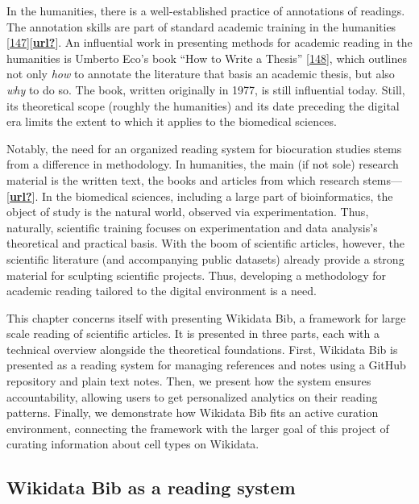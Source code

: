 In the humanities, there is a well-established practice of annotations of readings.
The annotation skills are part of standard academic training in the humanities {[}\protect\hyperlink{ref-rPKBwmYh}{147}{]}{[}\protect\hyperlink{ref-url}{\textbf{url?}}{]}.
An influential work in presenting methods for academic reading in the humanities is Umberto Eco's book ``How to Write a Thesis'' {[}\protect\hyperlink{ref-1HBVPtZGp}{148}{]}, which outlines not only \emph{how} to annotate the literature that basis an academic thesis, but also \emph{why} to do so.
The book, written originally in 1977, is still influential today.
Still, its theoretical scope (roughly the humanities) and its date preceding the digital era limits the extent to which it applies to the biomedical sciences.

Notably, the need for an organized reading system for biocuration studies stems from a difference in methodology.
In humanities, the main (if not sole) research material is the written text, the books and articles from which research stems---{[}\protect\hyperlink{ref-url}{\textbf{url?}}{]}.
In the biomedical sciences, including a large part of bioinformatics, the object of study is the natural world, observed via experimentation.
Thus, naturally, scientific training focuses on experimentation and data analysis's theoretical and practical basis.
With the boom of scientific articles, however, the scientific literature (and accompanying public datasets) already provide a strong material for sculpting scientific projects.
Thus, developing a methodology for academic reading tailored to the digital environment is a need.

This chapter concerns itself with presenting Wikidata Bib, a framework for large scale reading of scientific articles.
It is presented in three parts, each with a technical overview alongside the theoretical foundations.
First, Wikidata Bib is presented as a reading system for managing references and notes using a GitHub repository and plain text notes.
Then, we present how the system ensures accountability, allowing users to get personalized analytics on their reading patterns.
Finally, we demonstrate how Wikidata Bib fits an active curation environment, connecting the framework with the larger goal of this project of curating information about cell types on Wikidata.

\hypertarget{wikidata-bib-as-a-reading-system}{%
\subsection{Wikidata Bib as a reading system}\label{wikidata-bib-as-a-reading-system}}

